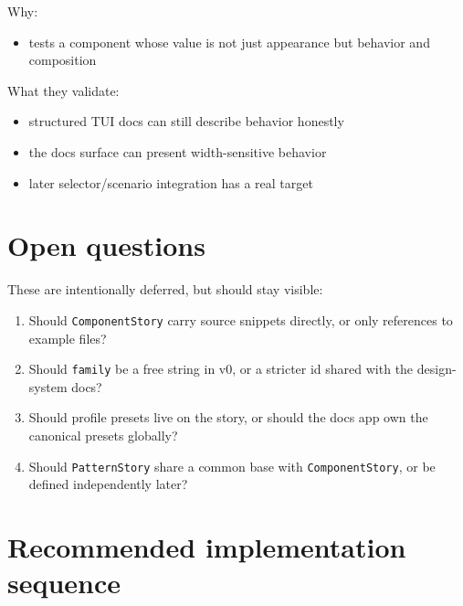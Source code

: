Why:

\begin{itemize}
\tightlist
\item
  tests a component whose value is not just appearance but behavior and composition
\end{itemize}

What they validate:

\begin{itemize}
\tightlist
\item
  structured TUI docs can still describe behavior honestly
\item
  the docs surface can present width-sensitive behavior
\item
  later selector/scenario integration has a real target
\end{itemize}

\section{Open questions}\label{record-039-open-questions}

These are intentionally deferred, but should stay visible:

\begin{enumerate}
\def\labelenumi{\arabic{enumi}.}
\tightlist
\item
  Should \texttt{C\allowbreak{}o\allowbreak{}m\allowbreak{}p\allowbreak{}o\allowbreak{}n\allowbreak{}e\allowbreak{}n\allowbreak{}t\allowbreak{}S\allowbreak{}t\allowbreak{}o\allowbreak{}r\allowbreak{}y} carry source snippets directly, or only references to example files?
\item
  Should \texttt{f\allowbreak{}a\allowbreak{}m\allowbreak{}i\allowbreak{}l\allowbreak{}y} be a free string in v0, or a stricter id shared with the design-system docs?
\item
  Should profile presets live on the story, or should the docs app own the canonical presets globally?
\item
  Should \texttt{P\allowbreak{}a\allowbreak{}t\allowbreak{}t\allowbreak{}e\allowbreak{}r\allowbreak{}n\allowbreak{}S\allowbreak{}t\allowbreak{}o\allowbreak{}r\allowbreak{}y} share a common base with \texttt{C\allowbreak{}o\allowbreak{}m\allowbreak{}p\allowbreak{}o\allowbreak{}n\allowbreak{}e\allowbreak{}n\allowbreak{}t\allowbreak{}S\allowbreak{}t\allowbreak{}o\allowbreak{}r\allowbreak{}y}, or be defined independently later?
\end{enumerate}

\section{Recommended implementation sequence}\label{record-039-recommended-implementation-sequence}

